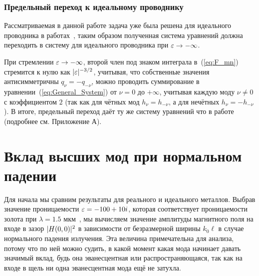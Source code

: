 \subsubsection{Предельный переход к идеальному проводнику}
Рассматриваемая в данной работе задача уже была решена для идеального проводника в работах~\cite{gorkunov2011transmission,Shapiro16}, таким образом полученная система уравнений должна переходить в систему для идеального проводника при $\varepsilon \to -\infty$. 

При стремлении $\varepsilon \to -\infty$, второй член под знаком интеграла в~(\ref{eq:F_mn}) стремится к нулю как $\lvert\varepsilon\rvert^{-3/2}$, 
учитывая, что собственные значения антисимметричны $q_{\nu} = -q_{-\nu}$, можно проводить суммирование в уравнении~(\ref{eq:General_System}) 
от $\nu = 0$ до $+\infty$, учитывая каждую моду $\nu \neq 0$ с коэффициентом $2$ (так как для чётных мод $h_\nu = h_{-\nu}$, а для нечётных $h_\nu = -h_{-\nu}$). В итоге, предельный переход даёт ту же систему
уравнений что в работе~\cite{Shapiro16} (подробнее см. Приложение А).

\section{Вклад высших мод при нормальном падении}

Для начала мы сравним результаты для реального и идеального металлов. Выбрав значение проницаемости $\varepsilon = -100 + 10i$, которая соответствует 
проницаемости золота при $\lambda = 1.5$ мкм~\cite{johnson1972optical}, мы вычисляем значение амплитуды магнитного поля на входе в зазор $\lvert H(0,0)\rvert^2$ в зависимости от 
безразмерной ширины $k_0 \ell$ в случае нормального падения излучения. Эта величина примечательна для анализа, потому что по ней можно судить, в какой момент какая мода начинает давать значимый вклад, будь она эванесцентная или распространяющаяся, так как на входе в щель ни одна эванесцентная мода ещё не затухла. 

